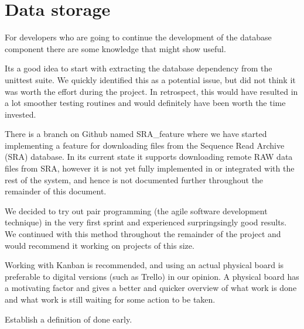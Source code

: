 \section{Data storage}

For developers who are going to continue the development of the database component there are some knowledge that might show useful.

Its a good idea to start with extracting the database dependency from the unittest suite. We quickly identified this as a potential issue, but did not think it was worth the effort during the project. In retrospect, this would have resulted in a lot smoother testing routines and would definitely have been worth the time invested.

There is a branch on Github named SRA_feature where we have started implementing a feature for downloading files from the Sequence Read Archive (SRA) database. In its current state it supports downloading remote RAW data files from SRA, however it is not yet fully implemented in or integrated with the rest of the system, and hence is not documented further throughout the remainder of this document.

We decided to try out pair programming (the agile software development technique) in the very first sprint and experienced surpringsingly good results.  We continued with this method throughout the remainder of the project and would recommend it working on projects of this size.

Working with Kanban is recommended, and using an actual physical board is preferable to digital versions (such as Trello) in our opinion. A physical board has a motivating factor and gives a better and quicker overview of what work is done and what work is still waiting for some action to be taken.

Establish a definition of done early.
